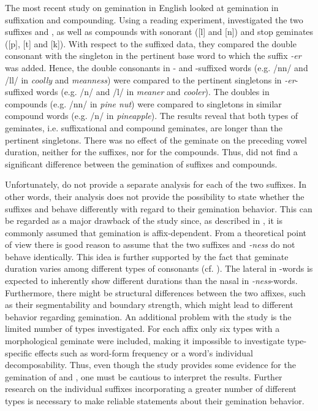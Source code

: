 The most recent study on gemination in English looked at gemination in suffixation and compounding. Using a reading experiment, \cite{Kotzor.2016} investigated the two suffixes  and , as well as compounds with sonorant ([l] and [n]) and stop geminates ([p], [t] and [k]). With respect to the suffixed data, they compared the double consonant with the singleton in the pertinent base word to which the suffix \textit{-er} was added. Hence, the double consonants in - and -suffixed words (e.g. /nn/  and /ll/ in \textit{coolly} and \textit{meanness}) were compared to the pertinent singletons in \textit{-er}-suffixed words (e.g. /n/ and /l/ in \textit{meaner} and \textit{cooler}). The doubles in compounds (e.g. /nn/ in \textit{pine nut}) were compared to singletons in similar compound words (e.g. /n/ in \textit{pineapple}). 
The results reveal that both types of geminates, i.e. suffixational and compound geminates, are longer than the pertinent singletons. There was no effect of the geminate on the preceding vowel duration, neither for the suffixes, nor for the compounds. Thus, \cite{Kotzor.2016} did not find a significant difference between the gemination of suffixes and compounds. 

Unfortunately, \cite{Kotzor.2016} do not provide a separate analysis for each of the two suffixes. In other words, their analysis does not provide the possibility to state whether the suffixes  and  behave differently with regard to their gemination behavior. This can be regarded as a major drawback of the study since, as described in , it is commonly assumed that gemination is affix-dependent. From a theoretical point of view there is good reason to assume that the two suffixes  and \textit{-ness} do not behave identically. 
This idea is further supported by the fact that geminate duration varies among different types of consonants (cf. ). The lateral in -words is expected to inherently show different durations than the nasal in \textit{-ness}-words. Furthermore, there might be structural differences between the two affixes, such as their segmentability and boundary strength, which might lead to different behavior regarding gemination. 
An additional problem with the study is the limited number of types investigated. For each affix only six types with a morphological geminate were included, making it impossible to investigate type-specific effects such as word-form frequency or a word's individual decomposability. Thus, even though the study provides some evidence for the gemination of  and , one must be cautious to interpret the results. Further research on the individual suffixes incorporating a greater number of different types is necessary to make reliable statements about their gemination behavior.


